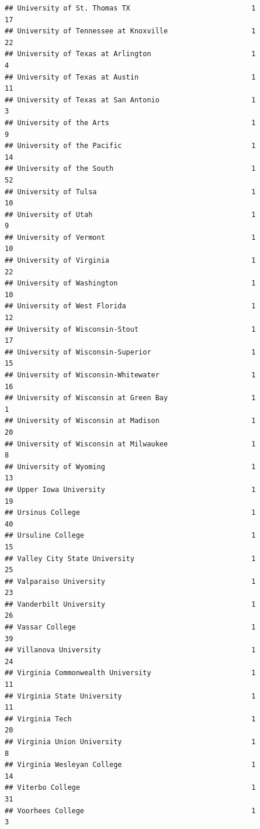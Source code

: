 \documentclass[
]{article}
\begin{document}
\begin{verbatim}
## University of St. Thomas TX                             1          17
## University of Tennessee at Knoxville                    1          22
## University of Texas at Arlington                        1           4
## University of Texas at Austin                           1          11
## University of Texas at San Antonio                      1           3
## University of the Arts                                  1           9
## University of the Pacific                               1          14
## University of the South                                 1          52
## University of Tulsa                                     1          10
## University of Utah                                      1           9
## University of Vermont                                   1          10
## University of Virginia                                  1          22
## University of Washington                                1          10
## University of West Florida                              1          12
## University of Wisconsin-Stout                           1          17
## University of Wisconsin-Superior                        1          15
## University of Wisconsin-Whitewater                      1          16
## University of Wisconsin at Green Bay                    1           1
## University of Wisconsin at Madison                      1          20
## University of Wisconsin at Milwaukee                    1           8
## University of Wyoming                                   1          13
## Upper Iowa University                                   1          19
## Ursinus College                                         1          40
## Ursuline College                                        1          15
## Valley City State University                            1          25
## Valparaiso University                                   1          23
## Vanderbilt University                                   1          26
## Vassar College                                          1          39
## Villanova University                                    1          24
## Virginia Commonwealth University                        1          11
## Virginia State University                               1          11
## Virginia Tech                                           1          20
## Virginia Union University                               1           8
## Virginia Wesleyan College                               1          14
## Viterbo College                                         1          31
## Voorhees College                                        1           3

\end{verbatim}
\end{document}
